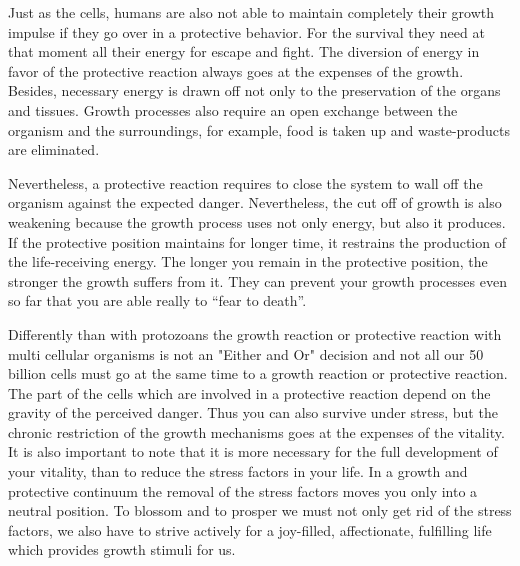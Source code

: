 \documentclass[../main.tex]{subfiles}
\begin{document}
Just as the cells, humans are also not able to maintain completely their growth impulse if they go over in a protective behavior. 
For the survival they need at that moment all their energy for escape and fight. 
The diversion of energy in favor of the protective reaction always goes at the expenses of the growth. 
Besides, necessary energy is drawn off not only to the preservation of the organs and tissues. 
Growth processes also require an open exchange between the organism and the surroundings, for example, food is taken up and waste-products are eliminated. 

 

Nevertheless, a protective reaction requires to close the system to wall off the organism against the expected danger. 
Nevertheless, the cut off of growth is also weakening because the growth process uses not only energy, but also it produces. 
If the protective position maintains for longer time, it restrains the production of the life-receiving energy. 
The longer you remain in the protective position, the stronger the growth suffers from it. 
They can prevent your growth processes even so far that you are able really to ``fear to death''.

 

Differently than with protozoans the growth reaction or protective reaction with multi cellular organisms is not an "Either and Or" decision and not all our 50 billion cells must go at the same time to a growth reaction or protective reaction. 
The part of the cells which are involved in a protective reaction depend on the gravity of the perceived danger.
Thus you can also survive under stress, but the chronic restriction of the growth mechanisms goes at the expenses of the vitality. 
It is also important to note that it is more necessary for the full development of your vitality, than to reduce the stress factors in your life. 
In a growth and protective continuum the removal of the stress factors moves you only into a neutral position. 
To blossom and to prosper we must not only get rid of the stress factors, we also have to strive actively for a joy-filled, affectionate, fulfilling life which provides growth stimuli for us.
\end{document}
